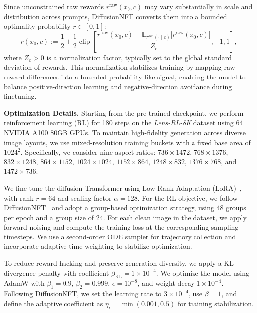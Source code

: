 \documentclass{llmxive}
\begin{document}
Since unconstrained raw rewards $r^{\mathrm{raw}}(x_0,c)$ may vary substantially in scale and distribution across prompts, DiffusionNFT converts them into a bounded optimality probability $r \in [0,1]$:
\begin{equation*}
\label{eq:diffusion_nft_reward}
r(x_0,c) :=
\frac{1}{2}
+
\frac{1}{2}
\operatorname{clip}
\left[
\frac{
r^{\mathrm{raw}}(x_0,c)
-
\mathbb{E}_{\pi^{\mathrm{old}}(\cdot \mid c)}
\big[r^{\mathrm{raw}}(x_0,c)\big]
}{Z_c},
-1, 1
\right],
\end{equation*}
where $Z_c > 0$ is a normalization factor, typically set to the global standard deviation of rewards. This normalization stabilizes training by mapping raw reward differences into a bounded probability-like signal, enabling the model to balance positive-direction learning and negative-direction avoidance during finetuning.

\noindent\textbf{Optimization Details.}
Starting from the pre-trained checkpoint, we perform reinforcement learning (RL) for 180 steps on the \textit{Lens-RL-8K} dataset using 64 NVIDIA A100 80GB GPUs. To maintain high-fidelity generation across diverse image layouts, we use mixed-resolution training buckets with a fixed base area of $1024^2$. Specifically, we consider nine aspect ratios: $736\times1472$, $768\times1376$, $832\times1248$, $864\times1152$, $1024\times1024$, $1152\times864$, $1248\times832$, $1376\times768$, and $1472\times736$.

We fine-tune the diffusion Transformer using Low-Rank Adaptation (LoRA)~\citep{hu2022lora}, with rank $r{=}64$ and scaling factor $\alpha{=}128$. For the RL objective, we follow DiffusionNFT~\citep{zheng2025diffusionnft} and adopt a group-based optimization strategy, using 48 groups per epoch and a group size of 24. For each clean image in the dataset, we apply forward noising and compute the training loss at the corresponding sampling timesteps. We use a second-order ODE sampler for trajectory collection and incorporate adaptive time weighting to stabilize optimization.

To reduce reward hacking and preserve generation diversity, we apply a KL-divergence penalty with coefficient $\beta_{\text{KL}}{=}1\times10^{-4}$. We optimize the model using AdamW with $\beta_1{=}0.9$, $\beta_2{=}0.999$, $\epsilon{=}10^{-8}$, and weight decay $1\times10^{-4}$. Following DiffusionNFT, we set the learning rate to $3\times10^{-4}$, use $\beta{=}1$, and define the adaptive coefficient as $\eta_i=\min(0.001,0.5)$ for training stabilization.
\end{document}
